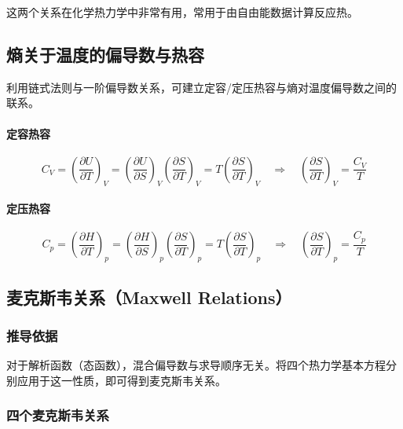 \documentclass[UTF8]{ctexart}
\begin{document}
这两个关系在化学热力学中非常有用，常用于由自由能数据计算反应热。

\subsection{熵关于温度的偏导数与热容}

利用链式法则与一阶偏导数关系，可建立定容/定压热容与熵对温度偏导数之间的联系。

\paragraph{定容热容}
\[
C_V=\left(\frac{\partial U}{\partial T}\right)_V
=\left(\frac{\partial U}{\partial S}\right)_V\left(\frac{\partial S}{\partial T}\right)_V
=T\left(\frac{\partial S}{\partial T}\right)_V
\quad\Longrightarrow\quad
\boxed{\left(\frac{\partial S}{\partial T}\right)_V=\frac{C_V}{T}}
\]

\paragraph{定压热容}
\[
C_p=\left(\frac{\partial H}{\partial T}\right)_p
=\left(\frac{\partial H}{\partial S}\right)_p\left(\frac{\partial S}{\partial T}\right)_p
=T\left(\frac{\partial S}{\partial T}\right)_p
\quad\Longrightarrow\quad
\boxed{\left(\frac{\partial S}{\partial T}\right)_p=\frac{C_p}{T}}
\]


\subsection{麦克斯韦关系（Maxwell Relations）}

\subsubsection{推导依据}

对于解析函数（态函数），混合偏导数与求导顺序无关。将四个热力学基本方程分别应用于这一性质，即可得到麦克斯韦关系。

\subsubsection{四个麦克斯韦关系}
\end{document}
